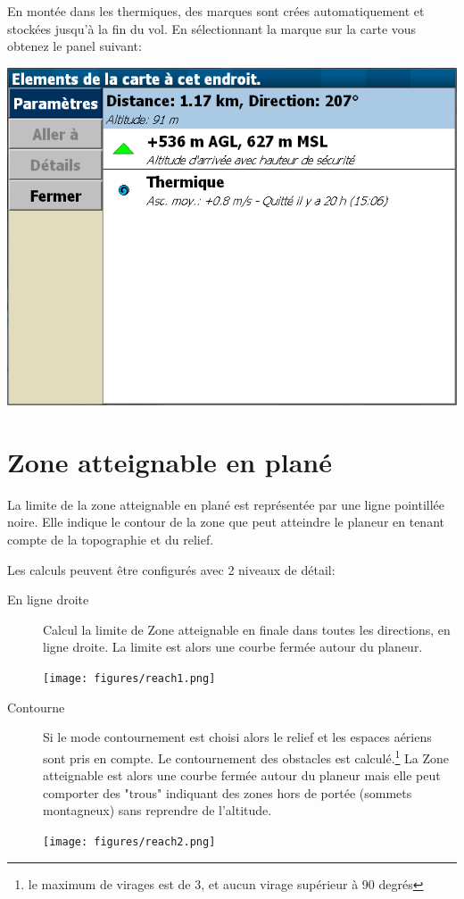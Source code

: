 En montée dans les thermiques, des marques sont crées automatiquement et stockées  jusqu'à la fin du vol. En sélectionnant la marque sur la carte vous obtenez le panel suivant:
\begin{center}
\includegraphics[angle=0,width=0.8\linewidth,keepaspectratio='true']{figures/marque_panel.png}
\end{center}

\section{Zone atteignable en plané }\label{sec:reach}

La limite de la zone atteignable en plané est représentée par une ligne pointillée noire.
Elle indique le contour de la zone que peut atteindre le planeur en tenant compte de la topographie et du relief.

Les calculs peuvent être configurés   avec 2 niveaux de détail:
\begin{description}
\item[En ligne droite] Calcul la limite de Zone atteignable en finale dans toutes les directions, en ligne droite. La limite est alors une courbe fermée autour du planeur.
\begin{center}
\texttt{[image: figures/reach1.png]}
\end{center}

\item[Contourne] Si le mode contournement est choisi alors le relief et les espaces aériens sont pris en compte. Le contournement des obstacles est calculé.\footnote{le maximum de virages est de 3, et aucun virage supérieur à 90 degrés}  La Zone atteignable est alors une courbe fermée autour du planeur mais elle peut comporter des "trous" indiquant des zones hors de portée (sommets montagneux) sans reprendre de l'altitude.
\begin{center}
\texttt{[image: figures/reach2.png]}
\end{center}

\end{description}

